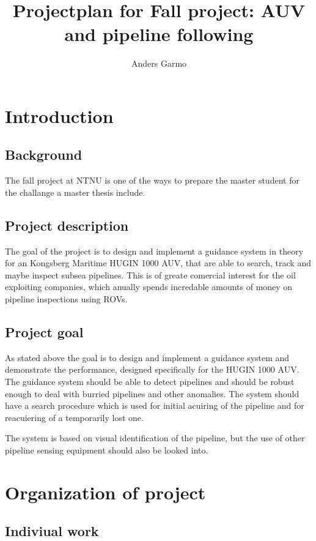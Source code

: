 \documentclass[a4paper,10pt]{article}
\title{Projectplan for Fall project: AUV and pipeline following}
\author{Anders Garmo}
\begin{document}
\maketitle
\newpage

\tableofcontents

\newpage

\section{Introduction}

	\subsection{Background}
	The fall project at NTNU is one of the ways to prepare the master student for the challange a master thesis include.
	
	
	\subsection{Project description}
	The goal of the project is to design and implement a guidance system in theory for an Kongsberg Maritime HUGIN 1000 AUV, that are able to search, track and maybe inspect subsea pipelines. This is of greate comercial interest for the oil exploiting companies, which anually spends incredable amounts of money on pipeline inspections using ROVs. 
		
	\subsection{Project goal}
	As stated above the goal is to design and implement a guidance system and demonstrate the performance, designed specifically for the HUGIN 1000 AUV. The guidance system should be able to detect pipelines and should be robust enough to deal with burried pipelines and other anomalies. The system should have a search procedure which is used for initial acuiring of the pipeline and for reacuiering of a temporarily lost one. 
	
	The system is based on visual identification of the pipeline, but the use of other pipeline sensing equipment should also be looked into. 
	
	
\section{Organization of project}
	\subsection{Indiviual work}
	
\end{document}
